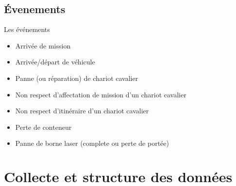 \documentclass{beamer}
\begin{document}
  \subsection{Évenements}
  \begin{frame}{Les événements}
   \begin{itemize}
    \item Arrivée de mission
    \pause
    \item Arrivée/départ de véhicule
    \pause
    \item Panne (ou réparation) de chariot cavalier
    \pause
    \item Non respect d'affectation de mission d'un chariot cavalier
    \pause
    \item Non respect d'itinéraire d'un chariot cavalier
    \pause
    \item Perte de conteneur
    \pause
    \item Panne de borne laser (complete ou perte de portée)
   \end{itemize}
  \end{frame}

\section{Collecte et structure des données}
 
\end{document}
